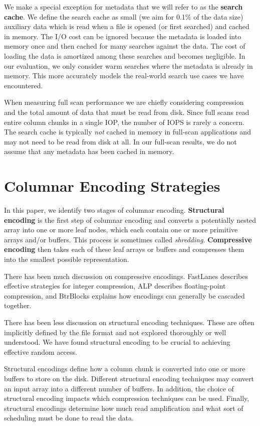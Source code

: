 \documentclass[sigconf, nonacm]{acmart}
\begin{document}
We make a special exception for metadata that we will refer to as the \textbf{search cache}.  We define the search cache as small (we aim for 0.1\% of the data size) auxiliary data which is read when a file is opened (or first searched) and cached in memory.  The I/O cost can be ignored because the metadata is loaded into memory once and then cached for many searches against the data.  The cost of loading the data is amortized among these searches and becomes negligible.  In our evaluation, we only consider warm searches where the metadata is already in memory.  This more accurately models the real-world search use cases we have encountered.

When measuring full scan performance we are chiefly considering compression and the total amount of data that must be read from disk.  Since full scans read entire column chunks in a single IOP, the number of IOPS is rarely a concern.  The search cache is typically \textit{not} cached in memory in full-scan applications and may not need to be read from disk at all.  In our full-scan results, we do not assume that any metadata has been cached in memory.

\section{Columnar Encoding Strategies} \label{strategies}

In this paper, we identify two stages of columnar encoding.  \textbf{Structural encoding} is the first step of columnar encoding and converts a potentially nested array into one or more leaf nodes, which each contain one or more primitive arrays and/or buffers.  This process is sometimes called \textit{shredding}.  \textbf{Compressive encoding} then takes each of these leaf arrays or buffers and compresses them into the smallest possible representation.

There has been much discussion on compressive encodings.  FastLanes\cite{FastLanes} describes effective strategies for integer compression, ALP\cite{Alp} describes floating-point compression, and BtrBlocks\cite{BtrBlocks} explains how encodings can generally be cascaded together.

There has been less discussion on structural encoding techniques.  These are often implicitly defined by the file format and not explored thoroughly or well understood.  We have found structural encoding to be crucial to achieving effective random access.

Structural encodings define how a column chunk is converted into one or more buffers to store on the disk.  Different structural encoding techniques may convert an input array into a different number of buffers.  In addition, the choice of structural encoding impacts which compression techniques can be used.  Finally, structural encodings determine how much read amplification and what sort of scheduling must be done to read the data.
\end{document}
